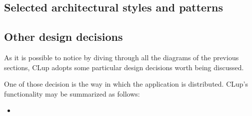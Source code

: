 \subsection{Selected architectural styles and patterns}
\subsection{Other design decisions}
As it is possible to notice by diving through all the diagrams of the previous sections, CLup adopts some particular design decisions worth being discussed. 

One of those decision is the way in which the application is distributed. CLup's functionality may be summarized as follows:
\begin{itemize}
    \item 
\end{itemize}

